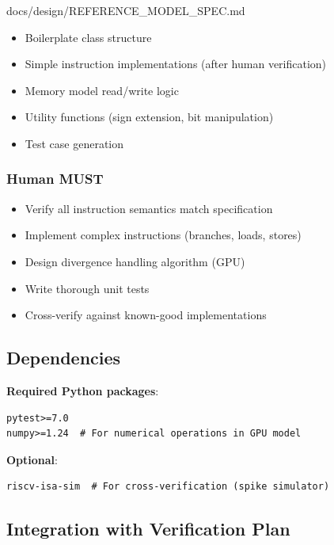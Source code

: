 \begin{relocated}{docs/design/REFERENCE_MODEL_SPEC.md}
\begin{itemize}
\tightlist
\item
  Boilerplate class structure
\item
  Simple instruction implementations (after human verification)
\item
  Memory model read/\allowbreak{}write logic
\item
  Utility functions (sign extension, bit manipulation)
\item
  Test case generation
\end{itemize}

\subsubsection{Human MUST}\label{ds:ch:reference-model:human-must}

\begin{itemize}
\tightlist
\item
  Verify all instruction semantics match specification
\item
  Implement complex instructions (branches, loads, stores)
\item
  Design divergence handling algorithm (GPU)
\item
  Write thorough unit tests
\item
  Cross-verify against known-good implementations
\end{itemize}

\subsection{Dependencies}\label{ds:ch:reference-model:dependencies}

\textbf{Required Python packages}:

\begin{lstlisting}[language={}]
pytest>=7.0
numpy>=1.24  # For numerical operations in GPU model
\end{lstlisting}

\textbf{Optional}:

\begin{lstlisting}[language={}]
riscv-isa-sim  # For cross-verification (spike simulator)
\end{lstlisting}

\subsection{Integration with Verification Plan}\label{ds:ch:reference-model:integration-with-verification-plan}


\end{relocated}
